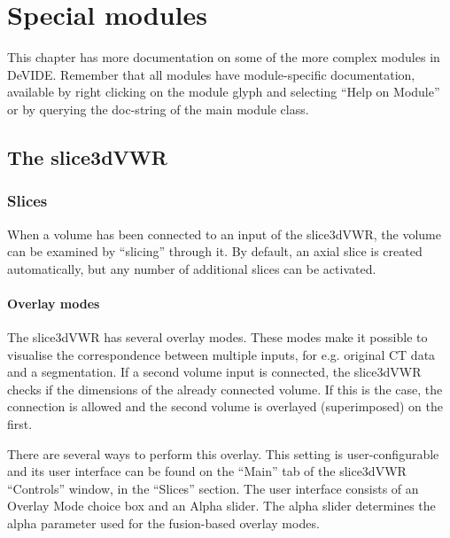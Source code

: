 \chapter{Special modules}\label{secSpecialModules}
%
%
\setfooter{\thepage}{}{}{}{}{\thepage}%

This chapter has more documentation on some of the more complex
modules in DeVIDE.  Remember that all modules have module-specific
documentation, available by right clicking on the module glyph and
selecting ``Help on Module'' or by querying the doc-string of the main
module class.

\section{The slice3dVWR}\label{secslice3dVWR}

\subsection{Slices}\label{secSlices}
When a volume has been connected to an input of the slice3dVWR, the
volume can be examined by ``slicing'' through it.  By default, an
axial slice is created automatically, but any number of additional
slices can be activated.

\subsubsection{Overlay modes}
The slice3dVWR has several overlay modes.  These modes make it
possible to visualise the correspondence between multiple inputs, for
e.g. original CT data and a segmentation.  If a second volume input is
connected, the slice3dVWR checks if the dimensions of the already
connected volume.  If this is the case, the connection is allowed and
the second volume is overlayed (superimposed) on the first.

There are several ways to perform this overlay.  This setting is
user-configurable and its user interface can be found on the ``Main''
tab of the slice3dVWR ``Controls'' window, in the ``Slices'' section.
The user interface consists of an Overlay Mode choice box and an Alpha
slider.  The alpha slider determines the alpha parameter used for the
fusion-based overlay modes.

